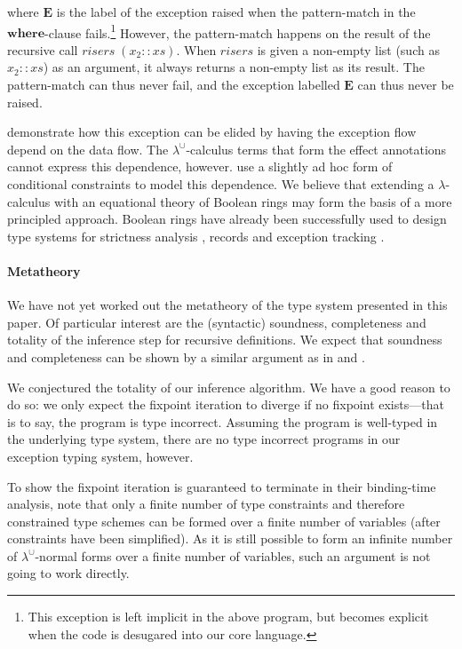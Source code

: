 \documentclass{llncs}
\newcommand{\Varid}[1]{\mathit{#1}}
\newcommand{\LambdaUnion}{\lambda^\cup}
\begin{document}
where \ensuremath{\mathbf{E}} is the label of the exception raised when the pattern-match in the \ensuremath{\mathbf{where}}-clause fails.\footnote{This exception is left implicit in the above program, but becomes explicit when the code is desugared into our core language.} However, the pattern-match happens on the result of the recursive call \ensuremath{\Varid{risers}\;(\Varid{x}_{\mathrm{2}}::\Varid{xs})}. When \ensuremath{\Varid{risers}} is given a non-empty list (such as \ensuremath{\Varid{x}_{\mathrm{2}}::\Varid{xs}}) as an argument, it always returns a non-empty list as its result. The pattern-match can thus never fail, and the exception labelled \ensuremath{\mathbf{E}} can thus never be raised.

\cite{Koot:2015:TEA:2678015.2682542} demonstrate
how this exception can be elided by having the exception flow depend on the data flow. The $\LambdaUnion$-calculus terms that form the effect annotations cannot express this dependence, however.
\cite{Koot:2015:TEA:2678015.2682542} use
a slightly ad hoc form of conditional constraints to model this dependence. We believe that extending a $\lambda$-calculus with an equational theory of Boolean rings may form the basis of a more principled approach. Boolean rings have already been successfully used to design type systems for strictness analysis \cite{Wright}, records \cite{LIX-RR-96-09} and exception tracking \cite{Benton:2007:SEA:1190315.1190320}.

\paragraph{Metatheory}
We have not yet worked out the metatheory of the type system presented in this paper. Of particular interest are the (syntactic) soundness, completeness and totality of the inference step for recursive definitions. We expect that soundness and completeness can be shown by a similar argument as in \cite{Mycroft1984} and \cite{Dussart:1995:PRS:647163.717680}.

We conjectured the totality of our inference algorithm. We have a good reason to do so: we only expect the fixpoint iteration to diverge if no fixpoint exists---that is to say, the program is type incorrect. Assuming the program is well-typed in the underlying type system, there are no type incorrect programs in our exception typing system, however.

To show the fixpoint iteration is guaranteed to terminate in their binding-time analysis, \cite{Dussart:1995:PRS:647163.717680} note that only a finite number of type constraints and therefore constrained type schemes can be formed over a finite number of variables (after constraints have been simplified). As it is still possible to form an infinite number of $\LambdaUnion$-normal forms over a finite number of variables, such an argument is not going to work directly.
\end{document}
